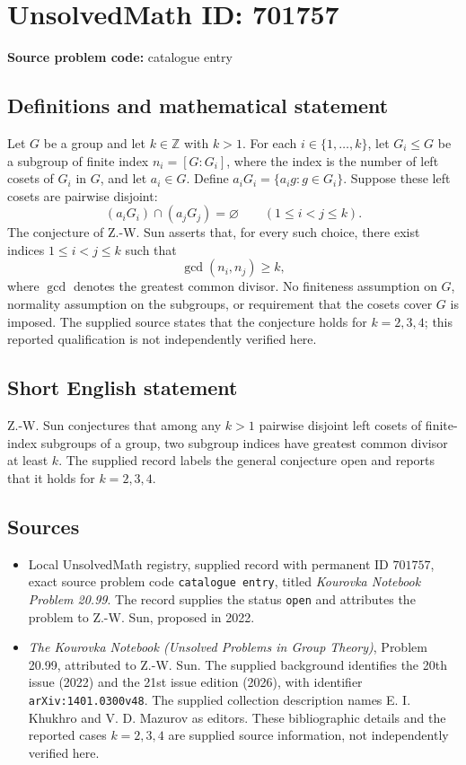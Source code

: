 \documentclass[11pt]{article}
\newcommand{\Z}{\mathbb{Z}}
\begin{document}
\section*{UnsolvedMath ID: 701757}
\textbf{Source problem code:} catalogue entry
\subsection{Definitions and mathematical statement}
Let \(G\) be a group and let \(k\in\Z\) with \(k>1\). For each \(i\in\{1,\ldots,k\}\), let \(G_i\leq G\) be a subgroup of finite index \(n_i=[G:G_i]\), where the index is the number of left cosets of \(G_i\) in \(G\), and let \(a_i\in G\). Define \(a_iG_i=\{a_ig:g\in G_i\}\). Suppose these left cosets are pairwise disjoint:
\[
(a_iG_i)\cap(a_jG_j)=\varnothing\qquad(1\leq i<j\leq k).
\]
The conjecture of Z.-W. Sun asserts that, for every such choice, there exist indices \(1\leq i<j\leq k\) such that
\[
\gcd(n_i,n_j)\geq k,
\]
where \(\gcd\) denotes the greatest common divisor. No finiteness assumption on \(G\), normality assumption on the subgroups, or requirement that the cosets cover \(G\) is imposed. The supplied source states that the conjecture holds for \(k=2,3,4\); this reported qualification is not independently verified here.
\subsection{Short English statement}
Z.-W. Sun conjectures that among any \(k>1\) pairwise disjoint left cosets of finite-index subgroups of a group, two subgroup indices have greatest common divisor at least \(k\). The supplied record labels the general conjecture open and reports that it holds for \(k=2,3,4\).
\subsection{Sources}
\begin{itemize}
\item Local UnsolvedMath registry, supplied record with permanent ID \(701757\), exact source problem code \texttt{catalogue entry}, titled \emph{Kourovka Notebook Problem 20.99}. The record supplies the status \texttt{open} and attributes the problem to Z.-W. Sun, proposed in 2022.
\item \emph{The Kourovka Notebook (Unsolved Problems in Group Theory)}, Problem 20.99, attributed to Z.-W. Sun. The supplied background identifies the 20th issue (2022) and the 21st issue edition (2026), with identifier \texttt{arXiv:1401.0300v48}. The supplied collection description names E. I. Khukhro and V. D. Mazurov as editors. These bibliographic details and the reported cases \(k=2,3,4\) are supplied source information, not independently verified here.
\end{itemize}
\end{document}

